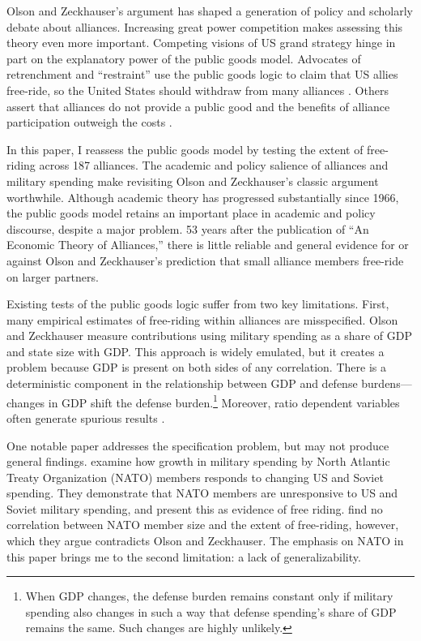 \documentclass[12pt]{article}
\begin{document}
Olson and Zeckhauser's argument has shaped a generation of policy and scholarly debate about alliances. 
Increasing great power competition makes assessing this theory even more important. 
Competing visions of US grand strategy hinge in part on the explanatory power of the public goods model. 
Advocates of retrenchment and ``restraint'' use the public goods logic to claim that US allies free-ride, so the United States should withdraw from many alliances \citep{Preble2009, Posen2014}. 
Others assert that alliances do not provide a public good and the benefits of alliance participation outweigh the costs \citep{Brooksetal2013, BrandsFeaver2017}. 


In this paper, I reassess the public goods model by testing the extent of free-riding across 187 alliances. 
The academic and policy salience of alliances and military spending make revisiting Olson and Zeckhauser's classic argument worthwhile.
Although academic theory has progressed substantially since 1966, the public goods model retains an important place in academic and policy discourse, despite a major problem.
53 years after the publication of ``An Economic Theory of Alliances,'' there is little reliable and general evidence for or against Olson and Zeckhauser's prediction that small alliance members free-ride on larger partners. 


Existing tests of the public goods logic suffer from two key limitations.
First, many empirical estimates of free-riding within alliances are misspecified.
Olson and Zeckhauser measure contributions using military spending as a share of GDP and state size with GDP.
This approach is widely emulated, but it creates a problem because GDP is present on both sides of any correlation.
There is a deterministic component in the relationship between GDP and defense burdens--- changes in GDP shift the defense burden.\footnote{
When GDP changes, the defense burden remains constant only if military spending also changes in such a way that defense spending's share of GDP remains the same. Such changes are highly unlikely.}  
Moreover, ratio dependent variables often generate spurious results \citep{Kronmal1993}.
 

One notable paper addresses the specification problem, but may not produce general findings. 
\citet{PluemperNeumayer2015} examine how growth in military spending by North Atlantic Treaty Organization (NATO) members responds to changing US and Soviet spending.
They demonstrate that NATO members are unresponsive to US and Soviet military spending, and present this as evidence of free riding.
\citet{PluemperNeumayer2015} find no correlation between NATO member size and the extent of free-riding, however, which they argue contradicts Olson and Zeckhauser.
The emphasis on NATO in this paper brings me to the second limitation: a lack of generalizability. 
\end{document}
